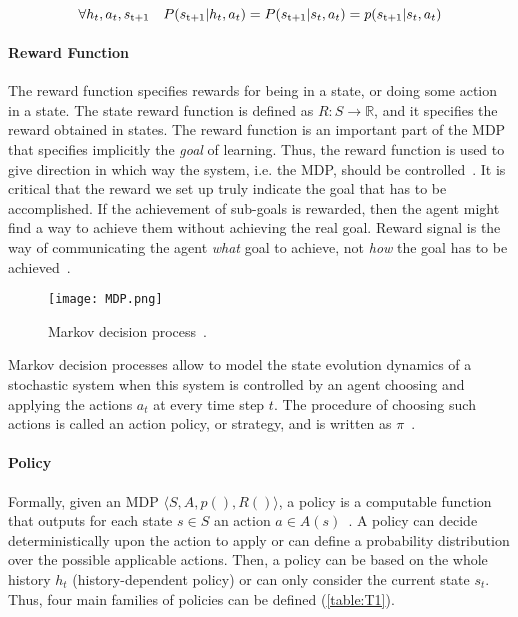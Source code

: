 \begin{equation}
	\forall h_t, a_t, s\textsubscript{t+1} \quad P(s\textsubscript{t+1} | h_t, a_t) = P(s\textsubscript{t+1} | s_t, a_t) = p(s\textsubscript{t+1} | s_t, a_t)
\end{equation}

\paragraph{Reward Function} The reward function specifies rewards for being in a state, or doing some action in a state. The state reward function is defined as $R : S \rightarrow \mathbb{R}$, and it specifies the reward obtained in states. The reward function is an important part of the MDP that specifies implicitly the \textit{goal} of learning. Thus, the reward function is used to give direction in which way the system, i.e. the MDP, should be controlled~\cite{wiering2012reinforcement}. It is critical that the reward we set up truly indicate the goal that has to be accomplished. If the achievement of sub-goals is rewarded, then the agent might find a way to achieve them without achieving the real goal. Reward signal is the way of communicating the agent \textit{what} goal to achieve, not \textit{how} the goal has to be achieved~\cite{SuttonBarto}.

\begin{figure}[h!]
	\centering
	\texttt{[image: MDP.png]}
	\caption{Markov decision process~\cite{Sigaud:2010:MDP:1841781}.}
	\label{fig:MDP}
\end{figure}

Markov decision processes allow to model the state evolution dynamics of a stochastic system when this system is controlled by an agent choosing and applying the actions $a_t$ at every time step $t$. The procedure of choosing such actions is called an action policy, or strategy, and is written as $\pi$~\cite{Sigaud:2010:MDP:1841781}.

\paragraph{Policy} Formally, given an MDP $\bigl\langle S, A, p(), R() \bigr\rangle$, a policy is a computable function that outputs for each state $s \in S$ an action $a \in A(s)$~\cite{wiering2012reinforcement}. A policy can decide deterministically upon the action to apply or can define a probability distribution over the possible applicable actions. Then, a policy can be based on the whole history $h_t$ (history-dependent policy) or can only consider the current state $s_t$. Thus, four main families of policies can be defined (\ref{table:T1}).


